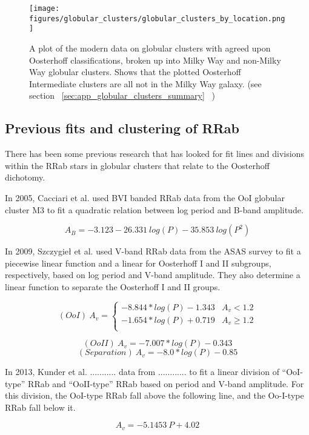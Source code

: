 \documentclass[]{article}
\begin{document}
\begin{figure}
	\centering
	\texttt{[image: figures/globular\_clusters/globular\_clusters\_by\_location.png]}
	\caption{A plot of the modern data on globular clusters with agreed upon Oosterhoff classifications, broken up into Milky Way and non-Milky Way globular clusters. Shows that the plotted Oosterhoff Intermediate clusters are all not in the Milky Way galaxy. (see section ~\ref{sec:app_globular_clusters_summary}~ )}
	\label{fig:modern_globular_clusters_location}
\end{figure}

\subsection{Previous fits and clustering of RRab}
There has been some previous research that has looked for fit lines and divisions within the RRab stars in globular clusters that relate to the Oosterhoff dichotomy.


In 2005, Cacciari et al. used BVI banded RRab data from the OoI globular cluster M3 to fit a quadratic relation between log period and B-band amplitude. \cite{cacciari_2005}

$$
A_{B} = -3.123 - 26.331~log(P) - 35.853~log(P^{2})
$$

In 2009, Szczygie{\l} et al. used V-band RRab data from the ASAS survey to fit a piecewise linear function and a linear for Oosterhoff I and II subgroups, respectively, based on log period and V-band amplitude. They also determine a linear function to separate the Oosterhoff I and II groups. \cite{szczygiel_2009}

$$
(OoI)~A_{v} =
\begin{cases} 
	-8.844 * log(P) - 1.343 & A_{v} < 1.2 \\
	-1.654 * log(P) + 0.719 & A_{v} \geq 1.2 \\
\end{cases}
$$

$$
(OoII)~A_{v} = -7.007 * log(P) - 0.343
$$
$$
(Separation)~A_{v} = -8.0 * log(P) - 0.85
$$

In 2013, Kunder et al. ........... data from ............ to fit a linear division of ``OoI-type'' RRab and ``OoII-type'' RRab based on period and V-band amplitude. For this division, the OoI-type RRab fall above the following line, and the Oo-I-type RRab fall below it. \cite{kunder_2013_d}

$$
A_{v} = -5.1453~P + 4.02
$$
\end{document}
